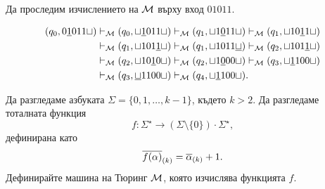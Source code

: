 \begin{example}
Да проследим изчислението на $\mathcal{M}$ върху вход $01011$.

\begin{align*}
  (q_0, 0\underline{1}011\sqcup) & \vdash_{\mathcal{M}} (q_0,\sqcup\underline{1}011\sqcup) \vdash_{\mathcal{M}} (q_1, \sqcup 1\underline{0}11\sqcup) \vdash_{\mathcal{M}} (q_1, \sqcup 10\underline{1}1\sqcup)\\
                           & \vdash_{\mathcal{M}} (q_1, \sqcup 101\underline{1}\sqcup) \vdash_{\mathcal{M}} (q_1, \sqcup 1011\underline{\sqcup}) \vdash_{\mathcal{M}} (q_2, \sqcup 101\underline{1}\sqcup)\\
                           & \vdash_{\mathcal{M}} (q_2, \sqcup 10\underline{1}0\sqcup) \vdash_{\mathcal{M}} (q_2, \sqcup 1\underline{0}00\sqcup) \vdash_{\mathcal{M}} (q_3, \sqcup \underline{1}100\sqcup)\\
                           & \vdash_{\mathcal{M}} (q_3, \underline{\sqcup}1100\sqcup) \vdash_{\mathcal{M}} (q_4, \sqcup\underline{1}100\sqcup).
\end{align*}
\end{example}


\begin{problem}
  Да разгледаме азбуката $\Sigma = \{0,1,\dots,k-1\}$, където $k > 2$.
  Да разгледаме тоталната функция 
  \[f:\Sigma^\star \to (\Sigma\setminus\{0\})\cdot\Sigma^\star,\]
  дефинирана като
  \[\overline{f(\alpha)}_{(k)} = \overline{\alpha}_{(k)} + 1.\]
  Дефинирайте машина на Тюринг $\mathcal{M}$, която изчислява функцията $f$.
\end{problem}

